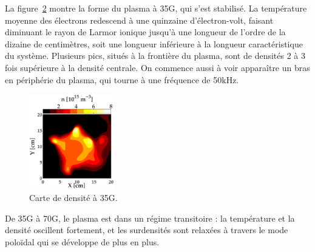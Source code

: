 \begin{refsection}
\begin{figure}[htbp]
    \label{4-CybeleVarMag-2}
\end{figure}
La figure~\ref{4-CybeleVarMag8} montre la forme du plasma à 35G, qui s'est
stabilisé. La température moyenne des électrons redescend à une quinzaine
d'électron-volt, faisant diminuant le rayon de Larmor ionique jusqu'à une
longueur de l'ordre de la dizaine de centimètres, soit une longueur inférieure à
la longueur caractéristique du système.
Plusieurs pics, situés à la frontière du plasma, sont de densités 2 à 3 fois
supérieure à la densité centrale. On commence aussi à voir apparaître un bras en
périphérie du plasma, qui tourne à une fréquence de 50kHz. 
\begin{figure}[!htbp]
\centering
\includegraphics[width=0.33\textwidth]{figures/4-CybeleVarMag8.eps}
{\caption{Carte de densité à 35G.}
\label{4-CybeleVarMag8}}
\end{figure}

De 35G à 70G, le plasma est dans un régime transitoire : la température
et la densité oscillent fortement, et les surdensités sont relaxées à travers 
le mode poloïdal qui se développe de plus en plus.

\end{refsection}
